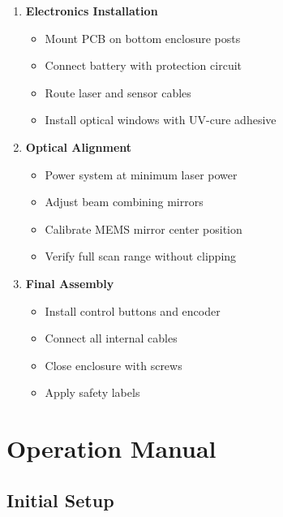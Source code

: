 \documentclass[12pt,a4paper]{article}
\begin{document}
\begin{enumerate}
\item \textbf{Electronics Installation}
    \begin{itemize}
    \item Mount PCB on bottom enclosure posts
    \item Connect battery with protection circuit
    \item Route laser and sensor cables
    \item Install optical windows with UV-cure adhesive
    \end{itemize}

\item \textbf{Optical Alignment}
    \begin{itemize}
    \item Power system at minimum laser power
    \item Adjust beam combining mirrors
    \item Calibrate MEMS mirror center position
    \item Verify full scan range without clipping
    \end{itemize}

\item \textbf{Final Assembly}
    \begin{itemize}
    \item Install control buttons and encoder
    \item Connect all internal cables
    \item Close enclosure with screws
    \item Apply safety labels
    \end{itemize}
\end{enumerate}

\section{Operation Manual}

\subsection{Initial Setup}
\end{document}

